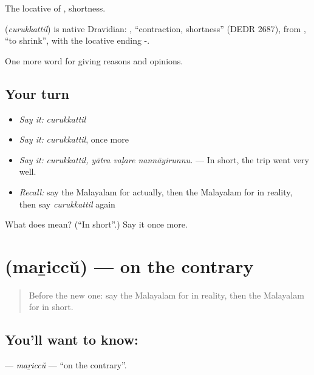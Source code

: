 The locative of , shortness.

\begin{cousinweb}
\textbf{} (\emph{curukkattil}) is native Dravidian: , \textquotedblleft{}contraction, shortness\textquotedblright{} (DEDR 2687), from , \textquotedblleft{}to shrink\textquotedblright{}, with the locative ending -.
\end{cousinweb}

\begin{grammarlens}[title={What you've built}]
One more word for giving reasons and opinions.
\end{grammarlens}

\subsection*{Your turn}
\begin{itemize}
\raggedright
  \item \emph{Say it:} \emph{curukkattil}
  \item \emph{Say it:} \emph{curukkattil}, once more
  \item \emph{Say it:} \emph{curukkattil, yātra vaḷare nannāyirunnu.} — In short, the trip went very well.
  \item \emph{Recall:} say the Malayalam for actually, then the Malayalam for in reality, then say \emph{curukkattil} again
\end{itemize}

\begin{tcolorbox}[breakable,colback=teal!4,colframe=teal!35!black,title={Before you move on}]
What does  mean? (\textquotedblleft{}In short\textquotedblright{}.) Say it once more.
\end{tcolorbox}
\section[\texorpdfstring{\ml{മറിച്ച്} (maṟiccŭ)}{മറിച്ച് (maṟiccŭ)}]{ (maṟiccŭ) — on the contrary}

\label{lesson:ML-C412-mariccu}



\begin{quote}
Before the new one: say the Malayalam for in reality, then the Malayalam for in short.
\end{quote}

\subsection*{You'll want to know: }
\textbf{} — \emph{maṟiccŭ} — \textquotedblleft{}on the contrary\textquotedblright{}.

